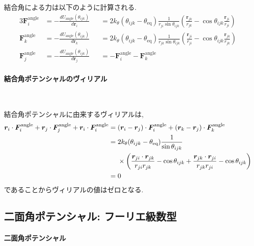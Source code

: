  結合角による力は以下のように計算される.
\begin{alignat}{3}
     \bm{F}_{i}^{\mathrm{angle}}
 &= 
    -\frac{d U_{\mathrm{angle}}(\theta_{ijk})}{d \bm{r}_{i}}
 &&=
     2k_{\theta} (\theta_{ijk} - \theta_{\mathrm{eq}})
     \frac{1}{r_{ji} \sin \theta_{ijk}}
     \left(
            \frac{\bm{r}_{jk}}{r_{jk}} - \cos \theta_{ijk} \frac{\bm{r}_{ji}}{r_{ji}}
     \right)
 \label{eq:BioModel11}
 \\
     \bm{F}_{k}^{\mathrm{angle}}
 &= 
    -\frac{d U_{\mathrm{angle}}(\theta_{ijk})}{d \bm{r}_{k}}
 &&=
    2k_{\theta} (\theta_{ijk} - \theta_{\mathrm{eq}})
    \frac{1}{r_{jk} \sin \theta_{ijk}}
    \left(
           \frac{\bm{r}_{ji}}{r_{ji}} - \cos \theta_{ijk} \frac{\bm{r}_{jk}}{r_{jk}}
    \right)
 \label{eq:BioModel12}
 \\
     \bm{F}_{j}^{\mathrm{angle}}
 &= 
    -\frac{d U_{\mathrm{angle}}(\theta_{ijk})}{d \bm{r}_{j}}
 &&=
    -\bm{F}_{i}^{\mathrm{angle}} - \bm{F}_{k}^{\mathrm{angle}}
 \label{eq:BioModel13}
\end{alignat}

\paragraph{結合角ポテンシャルのヴィリアル} \

結合角ポテンシャルに由来するヴィリアルは, 
\begin{align}
    \bm{r}_{i} \cdot \bm{F}_{i}^{\mathrm{angle}}
   +\bm{r}_{j} \cdot \bm{F}_{j}^{\mathrm{angle}}
   +\bm{r}_{i} \cdot \bm{F}_{i}^{\mathrm{angle}}
 &=
    (\bm{r}_{i} - \bm{r}_{j}) \cdot \bm{F}_{i}^{\mathrm{angle}}
   +(\bm{r}_{k} - \bm{r}_{j}) \cdot \bm{F}_{k}^{\mathrm{angle}}
 \notag
 \\
 &=
    2k_{\theta} (\theta_{ijk} - \theta_{\mathrm{eq}}) \frac{1}{\sin \theta_{ijk}}
 \notag
 \\
 &~~~~ \times
    \left(
           \frac{\bm{r}_{ji} \cdot \bm{r}_{jk}}{r_{ji} r_{jk}} - \cos \theta_{ijk}
          +\frac{\bm{r}_{jk} \cdot \bm{r}_{ji}}{r_{jk} r_{ji}} - \cos \theta_{ijk}
    \right)
 \notag
 \\
 &=
    0
 \notag
\end{align}
であることからヴィリアルの値はゼロとなる. 

\clearpage
\subsection{二面角ポテンシャル: フーリエ級数型}
\paragraph{二面角ポテンシャル} \

